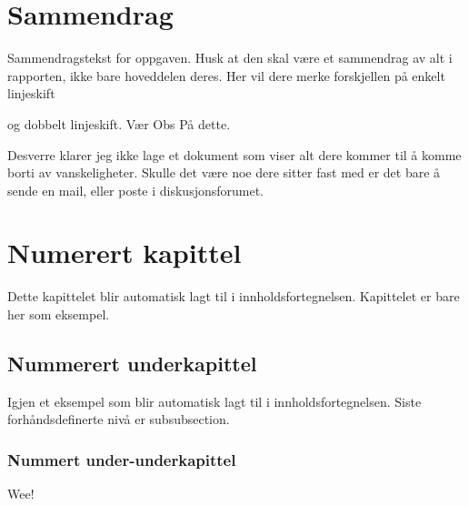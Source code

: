 \section*{Sammendrag}

Sammendragstekst for oppgaven. Husk at den skal være et sammendrag av alt i rapporten, 
ikke bare hoveddelen deres.
Her vil dere merke forskjellen på enkelt linjeskift 

og dobbelt linjeskift. Vær
Obs
På
dette.

Desverre klarer jeg ikke lage et dokument som viser alt dere kommer til å komme borti av vanskeligheter.
Skulle det være noe dere sitter fast med er det bare å sende en mail, eller poste i diskusjonsforumet.

\section{Numerert kapittel}

Dette kapittelet blir automatisk lagt til i innholdsfortegnelsen. Kapittelet er bare her som eksempel.

\subsection{Nummerert underkapittel}

Igjen et eksempel som blir automatisk lagt til i innholdsfortegnelsen. 
Siste forhåndsdefinerte nivå er subsubsection.

\subsubsection{Nummert under-underkapittel}

Wee!